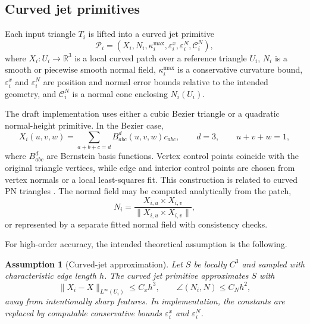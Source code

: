 \documentclass[preprint,12pt]{elsarticle}
\newtheorem{assumption}{Assumption}
\newcommand{\R}{\mathbb{R}}
\newcommand{\Cc}{\mathcal{C}}
\newcommand{\Pc}{\mathcal{P}}
\newcommand{\eps}{\varepsilon}
\begin{document}
\subsection{Curved jet primitives}
\label{subsec:curvedjet}

Each input triangle $T_i$ is lifted into a curved jet primitive
\begin{equation}
    \Pc_i=\left(X_i,N_i,\kappa_i^{\max},\eps_i^x,\eps_i^N,\Cc_i^N\right),
\end{equation}
where $X_i:U_i\rightarrow\R^3$ is a local curved patch over a reference triangle $U_i$, $N_i$ is a smooth or piecewise smooth normal field, $\kappa_i^{\max}$ is a conservative curvature bound, $\eps_i^x$ and $\eps_i^N$ are position and normal error bounds relative to the intended geometry, and $\Cc_i^N$ is a normal cone enclosing $N_i(U_i)$.

The draft implementation uses either a cubic Bezier triangle or a quadratic normal-height primitive. In the Bezier case,
\begin{equation}
    X_i(u,v,w)=\sum_{a+b+c=d}B_{abc}^{d}(u,v,w)c_{abc},
    \qquad d=3,
    \qquad u+v+w=1,
    \label{eq:bezier_patch}
\end{equation}
where $B_{abc}^{d}$ are Bernstein basis functions. Vertex control points coincide with the original triangle vertices, while edge and interior control points are chosen from vertex normals or a local least-squares fit. This construction is related to curved PN triangles \cite{vlachos2001pn}. The normal field may be computed analytically from the patch,
\begin{equation}
    N_i=\frac{X_{i,u}\times X_{i,v}}{\|X_{i,u}\times X_{i,v}\|},
\end{equation}
or represented by a separate fitted normal field with consistency checks.

For high-order accuracy, the intended theoretical assumption is the following.
\begin{assumption}[Curved-jet approximation]
\label{assump:jet_accuracy}
Let $S$ be locally $C^3$ and sampled with characteristic edge length $h$. The curved jet primitive approximates $S$ with
\begin{equation}
    \|X_i-X\|_{L^\infty(U_i)}\le C_x h^3,
    \qquad
    \angle(N_i,N)\le C_N h^2,
    \label{eq:jet_accuracy}
\end{equation}
away from intentionally sharp features. In implementation, the constants are replaced by computable conservative bounds $\eps_i^x$ and $\eps_i^N$.
\end{assumption}
\end{document}
